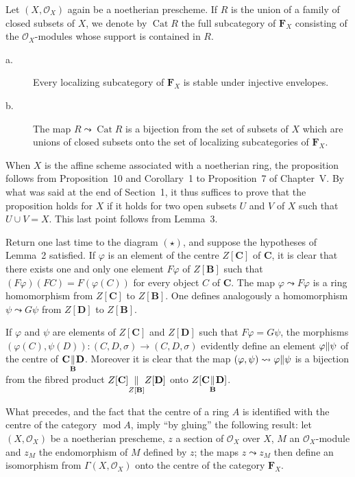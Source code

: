 Let $(X, \mathcal{O}_X)$ again be a noetherian prescheme. If $R$ is the
union of a family of closed subsets of $X$, we denote by
$\operatorname{Cat} R$ the full subcategory of $\mathbf{F}_X$ consisting
of the $\mathcal{O}_X$-modules whose support is contained in $R$.

\begin{proposition}
\begin{description}
\item[\normalfont a.] Every localizing subcategory of $\mathbf{F}_X$ is
      stable under injective envelopes.
\item[\normalfont b.] The map $R \leadsto \operatorname{Cat} R$ is a
      bijection from the set of subsets of $X$ which are unions of
      closed subsets onto the set of localizing subcategories of
      $\mathbf{F}_X$.
\end{description}
\end{proposition}

When $X$ is the affine scheme associated with a noetherian ring, the
proposition follows from Proposition~10 and Corollary~1 to
Proposition~7 of Chapter~V. By what was said at the end of Section~1,
it thus suffices to prove that the proposition holds for $X$ if it
holds for two open subsets $U$ and $V$ of $X$ such that
$U \cup V = X$. This last point follows from Lemma~3.

Return one last time to the diagram $(\star)$, and suppose the
hypotheses of Lemma~2 satisfied. If $\varphi$ is an element of the
centre $Z[\mathbf{C}]$ of $\mathbf{C}$, it is clear that there exists
one and only one element $F\varphi$ of $Z[\mathbf{B}]$ such that
$(F\varphi)(FC) = F(\varphi(C))$ for every object $C$ of $\mathbf{C}$.
The map $\varphi \leadsto F\varphi$ is a ring homomorphism from
$Z[\mathbf{C}]$ to $Z[\mathbf{B}]$. One defines analogously a
homomorphism $\psi \leadsto G\psi$ from $Z[\mathbf{D}]$ to
$Z[\mathbf{B}]$.

If $\varphi$ and $\psi$ are elements of $Z[\mathbf{C}]$ and
$Z[\mathbf{D}]$ such that $F\varphi = G\psi$, the morphisms
$(\varphi(C), \psi(D)) : (C, D, \sigma) \to (C, D, \sigma)$ evidently
define an element $\varphi \Vert \psi$ of the centre of
$\mathbf{C} \underset{\mathbf{B}}{\Vert} \mathbf{D}$. Moreover it is clear
that the map $(\varphi, \psi) \leadsto \varphi \Vert \psi$ is a
bijection from the fibred product
$Z[\mathbf{C}] \underset{Z[\mathbf{B}]}{\Vert} Z[\mathbf{D}]$ onto
$Z[\mathbf{C} \underset{\mathbf{B}}{\Vert} \mathbf{D}]$.

What precedes, and the fact that the centre of a ring $A$ is identified
with the centre of the category $\operatorname{mod} A$, imply ``by
gluing'' the following result: let $(X, \mathcal{O}_X)$ be a noetherian
prescheme, $z$ a section of $\mathcal{O}_X$ over $X$, $M$ an
$\mathcal{O}_X$-module and $z_M$ the endomorphism of $M$ defined by $z$;
the maps $z \leadsto z_M$ then define an isomorphism from
$\Gamma(X, \mathcal{O}_X)$ onto the centre of the category
$\mathbf{F}_X$.
